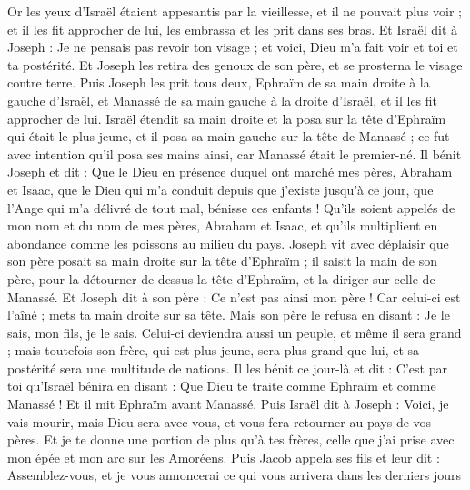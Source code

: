 \begin{multicols}{2}
Or les yeux d'Israël étaient appesantis par la vieillesse, et il ne pouvait plus voir ; et il les fit approcher de lui, les embrassa et les prit dans ses bras.
Et Israël dit à Joseph : Je ne pensais pas revoir ton visage ; et voici, Dieu m'a fait voir et toi et ta postérité.
Et Joseph les retira des genoux de son père, et se prosterna le visage contre terre.
Puis Joseph les prit tous deux, Ephraïm de sa main droite à la gauche d'Israël, et Manassé de sa main gauche à la droite d'Israël, et il les fit approcher de lui.
Israël étendit sa main droite et la posa sur la tête d'Ephraïm qui était le plus jeune, et il posa sa main gauche sur la tête de Manassé ; ce fut avec intention qu'il posa ses mains ainsi, car Manassé était le premier-né.
Il bénit Joseph et dit : Que le Dieu en présence duquel ont marché mes pères, Abraham et Isaac, que le Dieu qui m'a conduit depuis que j'existe jusqu'à ce jour,
que l'Ange qui m'a délivré de tout mal, bénisse ces enfants ! Qu'ils soient appelés de mon nom et du nom de mes pères, Abraham et Isaac, et qu'ils multiplient en abondance comme les poissons au milieu du pays.
Joseph vit avec déplaisir que son père posait sa main droite sur la tête d'Ephraïm ; il saisit la main de son père, pour la détourner de dessus la tête d'Ephraïm, et la diriger sur celle de Manassé.
Et Joseph dit à son père : Ce n'est pas ainsi mon père ! Car celui-ci est l'aîné ; mets ta main droite sur sa tête.
Mais son père le refusa en disant : Je le sais, mon fils, je le sais. Celui-ci deviendra aussi un peuple, et même il sera grand ; mais toutefois son frère, qui est plus jeune, sera plus grand que lui, et sa postérité sera une multitude de nations.
Il les bénit ce jour-là et dit : C'est par toi qu'Israël bénira en disant : Que Dieu te traite comme Ephraïm et comme Manassé ! Et il mit Ephraïm avant Manassé.
Puis Israël dit à Joseph : Voici, je vais mourir, mais Dieu sera avec vous, et vous fera retourner au pays de vos pères.
Et je te donne une portion de plus qu'à tes frères, celle que j'ai prise avec mon épée et mon arc sur les Amoréens.
\VerseOne{}Puis Jacob appela ses fils et leur dit : Assemblez-vous, et je vous annoncerai ce qui vous arrivera dans les derniers jours
\end{multicols}
